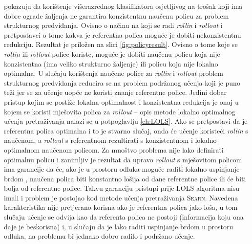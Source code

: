 \cite{daume15lols} pokazuju da korištenje višerazrednog klasifikatora
osjetljivog na trošak koji ima dobre ograde žaljenja ne garantira konzistentnu
naučenu policu za problem strukturnog predviđanja. Ovisno o načinu na koji se
radi \textit{rollin} i \textit{rollout} i pretpostavci o tome kakva je
referentna polica moguće je dobiti nekonzistentnu redukciju. Rezultat je
priložen na slici \ref{fig:policyresult}. Ovisno o tome koje se \textit{rollin}
ili \textit{rollout} police koriste, moguće je dobiti naučenu policu koja nije
konzistentna (ima veliko strukturno žaljenje) ili policu koja nije lokalno
optimalna. U slučaju korištenja naučene police za \textit{rollin} i
\textit{rollout} problem strukturnog predviđanja reducira se na problem
podržanog učenja koji je puno teži jer se za učenje uopće ne koristi znanje
referentne police. Jedini dobar pristup kojim se postiže lokalna optimalnost i
konzistentna redukcija je onaj u kojem se koristi mješovita polica za
\textit{rollout} -- opis metode lokalno optimalnog učenja pretraživanja nalazi
se u potpoglavlju \ref{ch:LOLS}. Ako se pretpostavi da je referentna polica
optimalna i to je stvarno slučaj, onda će učenje koristeći \textit{rollin} s
naučenom, a \textit{rollout} s referentnom rezultirati s konzistentnom i lokalno
optimalnom naučenom policom. Za mnoštvo problema nije lako definirati optimalnu
policu i zanimljiv je rezultat da upravo \textit{rollout} s mješovitom policom
ima garancije da će, ako je u prostoru odluka moguće raditi lokalno uspinjanje
brdom , naučena polica biti konstantno lošija od dane
referentne police ili će biti bolja od referentne police. Takvu garanciju
pristupi prije \textsc{LOLS} algoritma nisu imali i problem je postojao kod
metode učenja pretraživanja \textsc{Searn}. Navedena karakteristika nije
pretjerano korisna ako je referentna polica jako loša, u tom slučaju učenje se
odvija kao da referenta polica ne postoji (informacija koju ona daje je
beskorisna) i, u slučaju da je lako raditi uspinjanje brdom u prostoru odluka,
na problemu bi jednako dobro radilo i podržano učenje.

